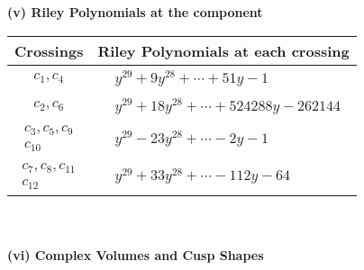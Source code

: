 \documentclass[1p]{elsarticle_modified}
\theoremstyle{definition}
\begin{document}
\newpage\renewcommand{\arraystretch}{1}
\flushleft \textbf{(v) Riley Polynomials at the component}\newline \\
\begin{tabular}{m{50pt}|m{274pt}}
Crossings & \hspace{64pt}Riley Polynomials at each crossing \\
\hline $$\begin{aligned}c_{1},c_{4}\end{aligned}$$&$\begin{aligned}
&y^{29}+9 y^{28}+\cdots+51 y-1
\end{aligned}$\\
\hline $$\begin{aligned}c_{2},c_{6}\end{aligned}$$&$\begin{aligned}
&y^{29}+18 y^{28}+\cdots+524288 y-262144
\end{aligned}$\\
\hline $$\begin{aligned}c_{3},c_{5},c_{9}\\c_{10}\end{aligned}$$&$\begin{aligned}
&y^{29}-23 y^{28}+\cdots-2 y-1
\end{aligned}$\\
\hline $$\begin{aligned}c_{7},c_{8},c_{11}\\c_{12}\end{aligned}$$&$\begin{aligned}
&y^{29}+33 y^{28}+\cdots-112 y-64
\end{aligned}$\\
\hline
\end{tabular}\\~\\
\newpage\flushleft \textbf{(vi) Complex Volumes and Cusp Shapes}
\end{document}
